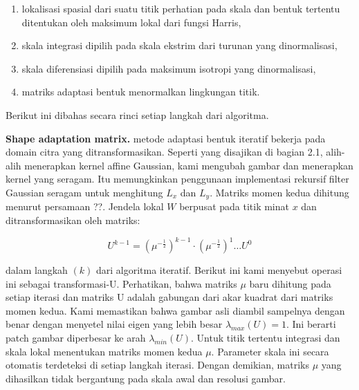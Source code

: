 \begin{enumerate}
  \item lokalisasi spasial dari suatu titik perhatian pada skala dan bentuk tertentu ditentukan oleh maksimum lokal dari fungsi Harris,
  \item skala integrasi dipilih pada skala ekstrim dari turunan yang dinormalisasi,
  \item skala diferensiasi dipilih pada maksimum isotropi yang dinormalisasi,
  \item matriks adaptasi bentuk menormalkan lingkungan titik.
\end{enumerate}

Berikut ini dibahas secara rinci setiap langkah dari algoritma.

\textbf{Shape adaptation matrix.} metode adaptasi bentuk iteratif bekerja pada domain citra yang ditransformasikan. Seperti yang disajikan di bagian 2.1, alih-alih menerapkan kernel affine Gaussian, kami mengubah gambar dan menerapkan kernel yang seragam. Itu memungkinkan penggunaan implementasi rekursif filter Gaussian seragam untuk menghitung \(L_{x}\) dan \(L_{y}\). Matriks momen kedua dihitung menurut persamaan ??. Jendela lokal \(W\) berpusat pada titik minat \(x\) dan ditransformasikan oleh matriks:

\begin{equation}
  U^{k-1} = (\mu^{-\frac{1}{2}})^{k-1} \cdot (\mu^{-\frac{1}{2}})^{1} \dots U^{0}
\end{equation}

dalam langkah \((k)\) dari algoritma iteratif. 
Berikut ini kami menyebut operasi ini sebagai transformasi-U. Perhatikan, bahwa matriks \(\mu\) 
baru dihitung pada setiap iterasi dan matriks U adalah gabungan dari akar kuadrat dari matriks momen kedua. 
Kami memastikan bahwa gambar asli diambil sampelnya dengan benar dengan menyetel nilai eigen yang lebih besar \(\lambda_{max}(U)=1\). Ini berarti patch gambar diperbesar ke arah \(\lambda_{min}(U)\). Untuk titik tertentu integrasi dan skala lokal menentukan matriks momen kedua \(\mu\). Parameter skala ini secara otomatis terdeteksi di setiap langkah iterasi. Dengan demikian, matriks \(\mu\) yang dihasilkan tidak bergantung pada skala awal dan resolusi gambar.

